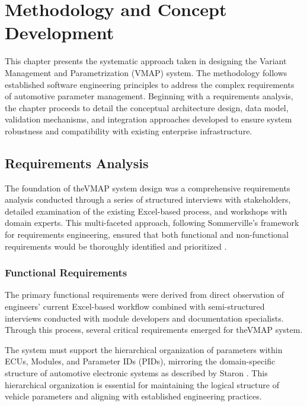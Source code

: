 \chapter{Methodology and Concept Development}
\label{chap:methodology}

This chapter presents the systematic approach taken in designing the Variant Management and Parametrization (VMAP) system. The methodology follows established software engineering principles to address the complex requirements of automotive parameter management. Beginning with a requirements analysis, the chapter proceeds to detail the conceptual architecture design, data model, validation mechanisms, and integration approaches developed to ensure system robustness and compatibility with existing enterprise infrastructure.

\section{Requirements Analysis}
\label{sec:requirements-analysis}

The foundation of the\ac{VMAP} system design was a comprehensive requirements analysis conducted through a series of structured interviews with stakeholders, detailed examination of the existing Excel-based process, and workshops with domain experts. This multi-faceted approach, following Sommerville's framework for requirements engineering, ensured that both functional and non-functional requirements would be thoroughly identified and prioritized \cite{sommerville2011software}.

\subsection{Functional Requirements}
\label{subsec:functional-requirements}

The primary functional requirements were derived from direct observation of engineers' current Excel-based workflow combined with semi-structured interviews conducted with module developers and documentation specialists. Through this process, several critical requirements emerged for the\ac{VMAP} system.

The system must support the hierarchical organization of parameters within \acp{ECU}, Modules, and Parameter IDs (PIDs), mirroring the domain-specific structure of automotive electronic systems as described by Staron \cite{staron2021automotive}. This hierarchical organization is essential for maintaining the logical structure of vehicle parameters and aligning with established engineering practices.

